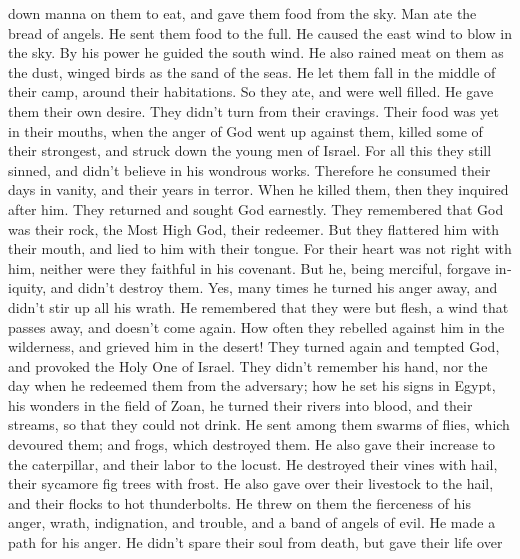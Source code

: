 \begin{paracol}{2}
\begin{otherlanguage}{english}
down manna on them to eat, and gave them food from the sky.
 Man ate the bread of angels. He sent them food to the
full.  He caused the east wind to blow in the sky. By his
power he guided the south wind.  He also rained meat on
them as the dust, winged birds as the sand of the seas. 
He let them fall in the middle of their camp, around their habitations.
 So they ate, and were well filled. He gave them their
own desire.  They didn't turn from their cravings. Their
food was yet in their mouths,  when the anger of God went
up against them, killed some of their strongest, and struck down the
young men of Israel.  For all this they still sinned, and
didn't believe in his wondrous works.  Therefore he
consumed their days in vanity, and their years in terror.
 When he killed them, then they inquired after him. They
returned and sought God earnestly.  They remembered that
God was their rock, the Most High God, their redeemer. 
But they flattered him with their mouth, and lied to him with their
tongue.  For their heart was not right with him, neither
were they faithful in his covenant.  But he, being
merciful, forgave iniquity, and didn't destroy them. Yes, many times he
turned his anger away, and didn't stir up all his wrath. 
He remembered that they were but flesh, a wind that passes away, and
doesn't come again.  How often they rebelled against him
in the wilderness, and grieved him in the desert!  They
turned again and tempted God, and provoked the Holy One of Israel.
 They didn't remember his hand, nor the day when he
redeemed them from the adversary;  how he set his signs
in Egypt, his wonders in the field of Zoan,  he turned
their rivers into blood, and their streams, so that they could not
drink.  He sent among them swarms of flies, which
devoured them; and frogs, which destroyed them.  He also
gave their increase to the caterpillar, and their labor to the locust.
 He destroyed their vines with hail, their sycamore fig
trees with frost.  He also gave over their livestock to
the hail, and their flocks to hot thunderbolts.  He threw
on them the fierceness of his anger, wrath, indignation, and trouble,
and a band of angels of evil.  He made a path for his
anger. He didn't spare their soul from death, but gave their life over

\end{otherlanguage}
\end{paracol}
